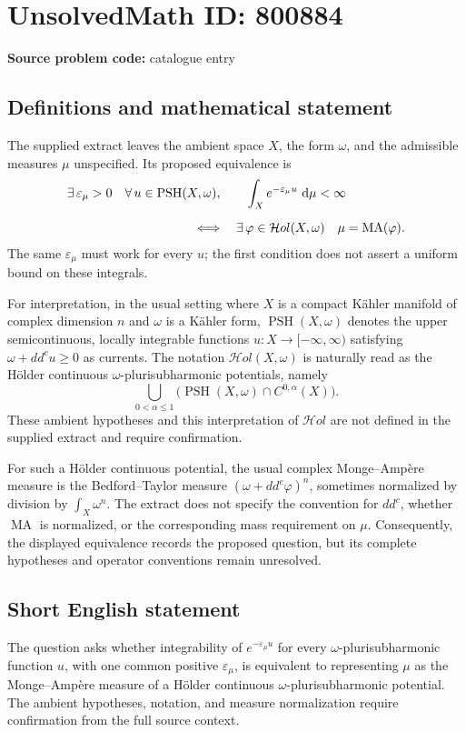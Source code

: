 \documentclass[11pt]{article}
\newcommand{\dd}{\,\mathrm{d}}
\begin{document}
\section*{UnsolvedMath ID: 800884}
\textbf{Source problem code:} catalogue entry
\subsection{Definitions and mathematical statement}
The supplied extract leaves the ambient space $X$, the form $\omega$, and the admissible measures $\mu$ unspecified. Its proposed equivalence is
\[
\begin{aligned}
&\exists\,\varepsilon_\mu>0\quad\forall\,u\in\operatorname{PSH}(X,\omega),\qquad
\int_X e^{-\varepsilon_\mu u}\,\dd\mu<\infty
\\[2mm]
&\hspace{35mm}\Longleftrightarrow\quad
\exists\,\varphi\in\mathcal{H}ol(X,\omega)\quad
\mu=\operatorname{MA}(\varphi).
\end{aligned}
\]
The same $\varepsilon_\mu$ must work for every $u$; the first condition does not assert a uniform bound on these integrals.

For interpretation, in the usual setting where $X$ is a compact K\"ahler manifold of complex dimension $n$ and $\omega$ is a K\"ahler form, $\operatorname{PSH}(X,\omega)$ denotes the upper semicontinuous, locally integrable functions $u:X\to[-\infty,\infty)$ satisfying $\omega+dd^c u\geq0$ as currents. The notation $\mathcal{H}ol(X,\omega)$ is naturally read as the H\"older continuous $\omega$-plurisubharmonic potentials, namely
\[
\bigcup_{0<\alpha\leq1}\bigl(\operatorname{PSH}(X,\omega)\cap C^{0,\alpha}(X)\bigr).
\]
These ambient hypotheses and this interpretation of $\mathcal{H}ol$ are not defined in the supplied extract and require confirmation.

For such a H\"older continuous potential, the usual complex Monge--Amp\`ere measure is the Bedford--Taylor measure $(\omega+dd^c\varphi)^n$, sometimes normalized by division by $\int_X\omega^n$. The extract does not specify the convention for $dd^c$, whether $\operatorname{MA}$ is normalized, or the corresponding mass requirement on $\mu$. Consequently, the displayed equivalence records the proposed question, but its complete hypotheses and operator conventions remain unresolved.
\subsection{Short English statement}
The question asks whether integrability of $e^{-\varepsilon_\mu u}$ for every $\omega$-plurisubharmonic function $u$, with one common positive $\varepsilon_\mu$, is equivalent to representing $\mu$ as the Monge--Amp\`ere measure of a H\"older continuous $\omega$-plurisubharmonic potential. The ambient hypotheses, notation, and measure normalization require confirmation from the full source context.
\end{document}

